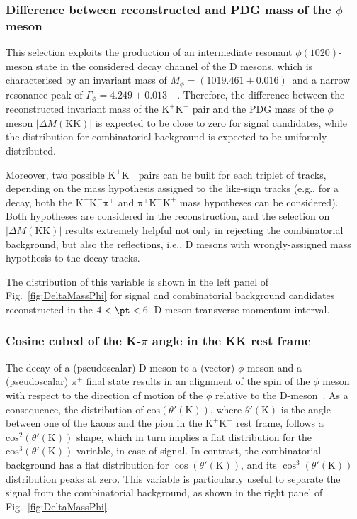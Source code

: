 \subsubsection{Difference between reconstructed and PDG mass of the \boldmath$\phi$ meson}
\begin{sloppypar}
This selection exploits the production of an intermediate resonant $\phi(1020)$-meson state in the considered decay channel of the D mesons, which is characterised by an invariant mass of \mbox{$M_\phi = (1019.461\pm0.016)$}~\mevcc and a narrow resonance peak of $\Gamma_\phi = 4.249\pm0.013$~\mevcc~\cite{pdg}. Therefore, the difference between the reconstructed invariant mass of the $\mathrm{K^+K^-}$ pair and the PDG mass of the $\phi$ meson $\lvert\Delta M(\mathrm{KK})\rvert$ is expected to be close to zero for signal candidates, while the distribution for combinatorial background is expected to be uniformly distributed.
\end{sloppypar}
Moreover, two possible $\mathrm{K^+K^-}$ pairs can be built for each triplet of tracks, depending on the mass hypothesis assigned to the like-sign tracks (e.g., for a \ds decay, both the $\mathrm{K^+K^-\pi^+}$ and $\mathrm{\pi^+K^-K^+}$ mass hypotheses can be considered). Both hypotheses are considered in the reconstruction, and the selection on $\lvert\Delta M(\mathrm{KK})\rvert$  results extremely helpful not only in rejecting the combinatorial background, but also the reflections, i.e., D mesons with wrongly-assigned mass hypothesis to the decay tracks.


The distribution of this variable is shown in the left panel of Fig.~\ref{fig:DeltaMassPhi} for signal and combinatorial background candidates reconstructed in the $4 < \pt < 6$~\gevc D-meson transverse momentum interval.

\subsubsection{Cosine cubed of the K-\boldmath$\pi$ angle in the KK rest frame}
The decay of a (pseudoscalar) D-meson to a (vector) $\phi$-meson and a (pseudoscalar) $\pi^+$ final state results in an alignment of the spin of the $\phi$ meson with respect to the direction of motion of the $\phi$ relative to the D-meson~\cite{ZEUS:2000rhm}. As a consequence, the distribution of $\mathrm{cos}\left(\theta'(\mathrm K)\right)$, where $\theta'(\mathrm K)$ is the angle between one of the kaons and the pion in the $\mathrm{K^+K^-}$
rest frame, follows a $\mathrm{cos}^2\left(\theta'(\mathrm K)\right)$ shape, which in turn implies a flat distribution for the $\mathrm{cos}^3\left(\theta'(\mathrm K)\right)$ variable, in case of signal. In contrast, the combinatorial background has a flat distribution for $\cos\left(\theta'(\mathrm K)\right)$, and its $\cos^3\left(\theta'(\mathrm K)\right)$ distribution peaks at zero. This variable is particularly useful to separate the signal from the combinatorial background, as shown in the right panel of Fig.~\ref{fig:DeltaMassPhi}.

